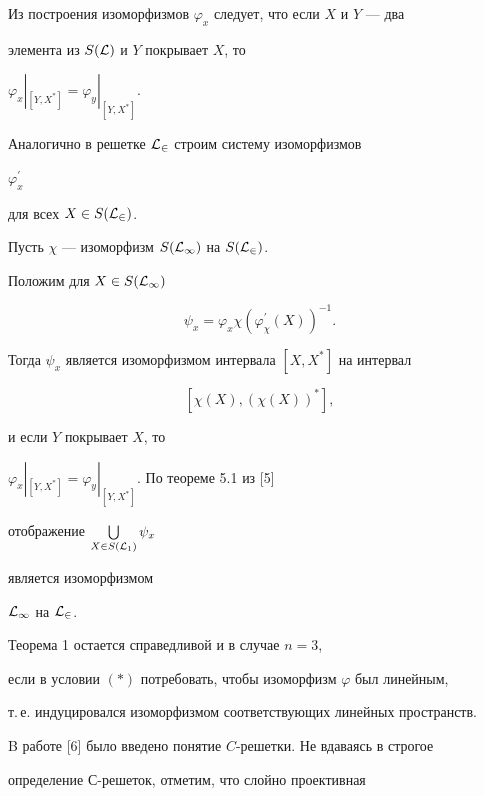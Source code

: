 \begin{pf}
Из построения изоморфизмов $\varphi_x$ следует, что если $X$ и $Y$ --- два


элемента из $S(\cal L)$ и $Y$ покрывает $X$, то


$\varphi_x |_{[Y,X^*]}=\varphi_y |_{[Y,X^*]}.$





Аналогично в решетке $\cal L_2$ строим систему изоморфизмов


$\varphi^\prime_x$


для всех $X \in S(\cal L_2)$.


Пусть $\chi$ --- изоморфизм $S(\cal L_1)$ на $S(\cal L_2)$.


Положим для $X \in S(\cal L_1)$


$$


\psi_x=\varphi_x \chi (\varphi^\prime_{\chi}(X))^{-1}.


$$


Тогда $\psi_x$ является изоморфизмом интервала $[X,X^*]$ на интервал


$$


[\chi(X),(\chi(X))^*],


$$


и если $Y$ покрывает $X$, то


$\varphi_x |_{[Y,X^*]}=\varphi_y |_{[Y,X^*]}.$ По теореме 5.1 из [5]


отображение $\bigcup\limits_{X \in S({\cal L}_1)} \psi_x$


является изоморфизмом


$\cal L_1$ на $\cal L_2$.


\end{pf}





\begin{notenonum}


Теорема 1 остается справедливой и в случае $n=3$,


если в условии $(\ast)$ потребовать, чтобы изоморфизм $\varphi$ был линейным,


т.\,е. индуцировался изоморфизмом соответствующих линейных пространств.


\end{notenonum}





B работе [6] было введено понятие $C$-решетки. Не вдаваясь в строгое


определение $С$-решеток, отметим, что слойно проективная



